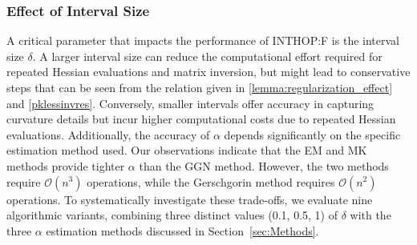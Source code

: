 \documentclass{elsarticle}
\numberwithin{equation}{section}
\begin{document}
\subsubsection{Effect of Interval Size}
A critical parameter that impacts the performance of INTHOP:F is the interval size $\delta$. A larger interval size can reduce the computational effort required for repeated Hessian evaluations and matrix inversion, but might lead to conservative steps that can be seen from the relation given in \eqref{lemma:regularization_effect} and \eqref{pklessinvres}. Conversely, smaller intervals offer accuracy in capturing curvature details but incur higher computational costs due to repeated Hessian evaluations. Additionally, the accuracy of $\alpha$ depends significantly on the specific estimation method used. Our observations indicate that the EM and MK methods provide tighter $\alpha$ than the GGN method. However, the two methods require $\mathcal{O}(n^3)$ operations, while the Gerschgorin method requires $\mathcal{O}(n^2)$ operations. To systematically investigate these trade-offs, we evaluate nine algorithmic variants, combining three distinct values (0.1, 0.5, 1) of $\delta$ with the three $\alpha$ estimation methods discussed in Section~\ref{sec:Methods}.  








\end{document}
